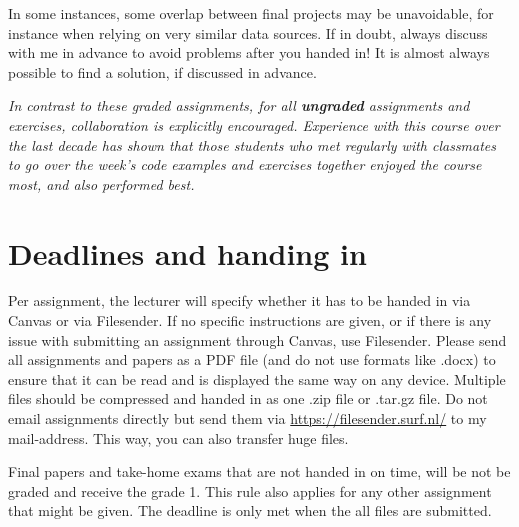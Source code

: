 \documentclass[a4paper,10pt,twocolumn]{report}
\begin{document}
In some instances, some overlap between final projects may be unavoidable, for instance when relying on very similar data sources. If in doubt, always discuss with me in advance to avoid problems after you handed in! It is almost always possible to find a solution, if discussed in advance.

\emph{In contrast to these graded assignments, for all \textbf{ungraded} assignments and exercises, collaboration is explicitly encouraged. Experience with this course over the last decade has shown that those students who met regularly with classmates to go over the week's code examples and exercises together enjoyed the course most, and also performed best.}

\section{Deadlines and handing in}
Per assignment, the lecturer will specify whether it has to be handed in via Canvas or via Filesender. If no specific instructions are given, or if there is any issue with submitting an assignment through Canvas, use Filesender. Please send all assignments and papers as a PDF file (and do not use formats like .docx) to ensure that it can be read and is displayed the same way on any device. Multiple files should be compressed and handed in as one .zip file or .tar.gz file. Do not email assignments directly but send them via \url{https://filesender.surf.nl/} to my mail-address. This way, you can also transfer huge files.

Final papers and take-home exams that are not handed in on time, will be not be graded and receive the grade 1. This rule also applies for any other assignment that might be given. The deadline is only met when the all files are submitted.
\end{document}
